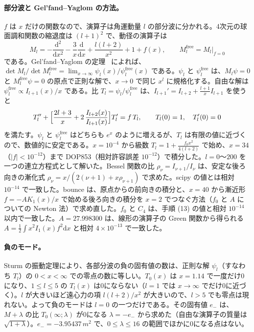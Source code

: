 \documentclass[a4paper,10pt]{ltjsarticle}
\newcommand{\dd}{\mathrm{d}}
\begin{document}
\paragraph{部分波と Gel'fand--Yaglom の方法。}$f$ は $x$ だけの関数なので、演算子は角運動量 $l$ の部分波に分かれる。4次元の球面調和関数の縮退度は $(l+1)^2$ で、動径の演算子は
\begin{equation*}
M_l=-\frac{\dd^2}{\dd x^2}-\frac3x\frac{\dd}{\dd x}+\frac{l(l+2)}{x^2}+1+f(x),\qquad M_l^{\mathrm{free}}=M_l\big|_{f=0}
\end{equation*}
である。Gel'fand--Yaglom の定理~\cite{gy,dunnemin} によれば、$\det M_l/\det M_l^{\mathrm{free}}=\lim_{x\to\infty}\psi_l(x)/\psi_l^{\mathrm{free}}(x)$ である。$\psi_l$ と $\psi_l^{\mathrm{free}}$ は、$M_l\psi=0$ と $M_l^{\mathrm{free}}\psi=0$ の原点で正則な解で、$x\to0$ で同じ $x^l$ に規格化する。自由な解は $\psi_l^{\mathrm{free}}\propto I_{l+1}(x)/x$ である。比 $T_l=\psi_l/\psi_l^{\mathrm{free}}$ は、$I_{l+1}'=I_{l+2}+\frac{l+1}{x}I_{l+1}$ を使うと
\begin{equation*}
T_l''+\Bigl[\frac{2l+3}{x}+2\,\frac{I_{l+2}(x)}{I_{l+1}(x)}\Bigr]T_l'=f\,T_l,\qquad T_l(0)=1,\quad T_l'(0)=0
\end{equation*}
を満たす。$\psi_l$ と $\psi_l^{\mathrm{free}}$ はどちらも $e^x$ のように増えるが、$T_l$ は有限の値に近づくので、数値的に安定である。$x=10^{-4}$ から級数 $T_l=1+\frac{f_0x^2}{4(l+2)}$ で始め、$x=34$（$|f|<10^{-12}$）まで DOP853（相対許容誤差 $10^{-12}$）で積分した。$l=0$〜$200$ を一つの連立方程式として解いた。Bessel 関数の比 $\rho_\nu=I_{\nu+1}/I_\nu$ は、安定な後ろ向きの漸化式 $\rho_\nu=x/(2(\nu+1)+x\rho_{\nu+1})$ で求めた。scipy の値とは相対 $10^{-14}$ で一致した。bounce は、原点からの前向きの積分と、$x=40$ から漸近形 $f=-AK_1(x)/x$ で始める後ろ向きの積分を $x=2$ でつなぐ方法（$f_0$ と $A$ についての Newton 法）で求め直した。$f_0$ と $C_4$ は、手順 (13) の値と相対 $10^{-14}$ 以内で一致した。$A=27.998300$ は、線形の演算子の Green 関数から得られる $A=\frac12\int x^2I_1(x)f^2\dd x$ と相対 $4\times10^{-13}$ で一致した。

\paragraph{負のモード。}Sturm の振動定理により、各部分波の負の固有値の数は、正則な解 $\psi_l$（すなわち $T_l$）の $0<x<\infty$ での零点の数に等しい。$T_0(x)$ は $x=1.14$ で一度だけ0になり、$1\le l\le5$ の $T_l(x)$ は0にならない（$l=1$ では $x\to\infty$ でだけ0に近づく）。$l$ が大きいほど遠心力の項 $l(l+2)/x^2$ が大きいので、$l>5$ でも零点は現れない。よって負のモードは $l=0$ の一つだけである。その固有値 $e_-$ は、$M+\lambda$ の比 $T_0(\infty;\lambda)$ が0になる $\lambda=-e_-$ から求めた（自由な演算子の質量は $\sqrt{1+\lambda}$）。$e_-=-3.95437\,m^2$ で、$0\le\lambda\le16$ の範囲でほかに0になる点はない。
\end{document}
